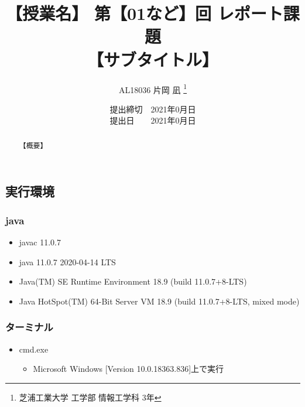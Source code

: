 \documentclass[a4paper, papersize]{jsarticle}
\title{
\vspace{-2cm} %
【授業名】 第【01など】回 レポート課題 \\
【サブタイトル】}
\author{AL18036 片岡 凪 \thanks{芝浦工業大学 工学部 情報工学科 3年}}
\date{提出締切　2021年0月日 \\
提出日　　2021年0月日}
\begin{document}
\maketitle


\setcounter{tocdepth}{2}
\tableofcontents
\newpage


\begin{abstract}
【概要】
\end{abstract}


\begin{multicols}{2}


\section{実行環境}
\subsubsection{java}
\begin{itemize}
\item javac 11.0.7
\item java 11.0.7 2020-04-14 LTS
\item Java(TM) SE Runtime Environment 18.9 (build 11.0.7+8-LTS)
\item Java HotSpot(TM) 64-Bit Server VM 18.9 (build 11.0.7+8-LTS, mixed mode)
\end{itemize}


\subsubsection{ターミナル}
\begin{itemize}
\item cmd.exe
\begin{itemize}
\item Microsoft Windows [Version 10.0.18363.836]上で実行
\end{itemize}
\end{itemize}



\end{multicols}
\end{document}
